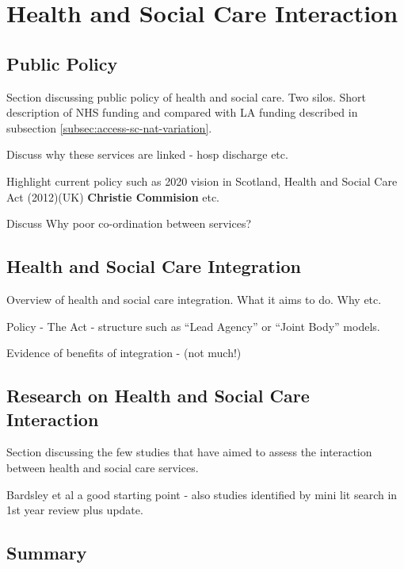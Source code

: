 \documentclass[12pt,]{report}
\begin{document}
\section{Health and Social Care Interaction}\label{sec:hsc-interaction}

\subsection{Public Policy}\label{subsec:policy}

Section discussing public policy of health and social care. Two silos.
Short description of NHS funding and compared with LA funding described
in subsection \ref{subsec:access-sc-nat-variation}.

Discuss why these services are linked - hosp discharge etc.

Highlight current policy such as 2020 vision in Scotland, Health and
Social Care Act (2012)(UK) \textbf{Christie Commision} etc.

Discuss Why poor co-ordination between services?

\subsection{Health and Social Care Integration}\label{subsec:hsc-integration}

Overview of health and social care integration. What it aims to do. Why
etc.

Policy - The Act - structure such as ``Lead Agency'' or ``Joint Body''
models.

Evidence of benefits of integration - (not much!)

\subsection{Research on Health and Social Care Interaction}\label{subsec:research}

Section discussing the few studies that have aimed to assess the
interaction between health and social care services.

Bardsley et al\citeyearpar{RN183} a good starting point - also studies
identified by mini lit search in 1st year review plus update.

\subsection{Summary}\label{subsec:hsc-interaction-summary}
\end{document}
